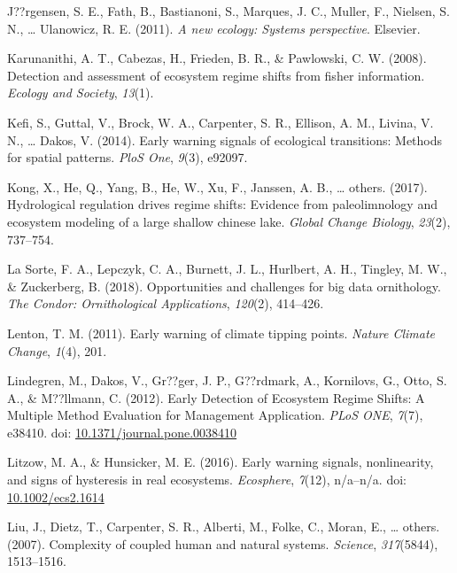 \documentclass[12pt,twoside,openany]{reedthesis}
\begin{document}
\leavevmode\hypertarget{ref-jorgensen_new_2011}{}%
J??rgensen, S. E., Fath, B., Bastianoni, S., Marques, J. C., Muller, F., Nielsen, S. N., \ldots{} Ulanowicz, R. E. (2011). \emph{A new ecology: Systems perspective}. Elsevier.

\leavevmode\hypertarget{ref-karunanithi_detection_2008}{}%
Karunanithi, A. T., Cabezas, H., Frieden, B. R., \& Pawlowski, C. W. (2008). Detection and assessment of ecosystem regime shifts from fisher information. \emph{Ecology and Society}, \emph{13}(1).

\leavevmode\hypertarget{ref-kefi2014early}{}%
Kefi, S., Guttal, V., Brock, W. A., Carpenter, S. R., Ellison, A. M., Livina, V. N., \ldots{} Dakos, V. (2014). Early warning signals of ecological transitions: Methods for spatial patterns. \emph{PloS One}, \emph{9}(3), e92097.

\leavevmode\hypertarget{ref-kong2017hydrological}{}%
Kong, X., He, Q., Yang, B., He, W., Xu, F., Janssen, A. B., \ldots{} others. (2017). Hydrological regulation drives regime shifts: Evidence from paleolimnology and ecosystem modeling of a large shallow chinese lake. \emph{Global Change Biology}, \emph{23}(2), 737--754.

\leavevmode\hypertarget{ref-lasorte2018opportunities}{}%
La Sorte, F. A., Lepczyk, C. A., Burnett, J. L., Hurlbert, A. H., Tingley, M. W., \& Zuckerberg, B. (2018). Opportunities and challenges for big data ornithology. \emph{The Condor: Ornithological Applications}, \emph{120}(2), 414--426.

\leavevmode\hypertarget{ref-lenton2011early}{}%
Lenton, T. M. (2011). Early warning of climate tipping points. \emph{Nature Climate Change}, \emph{1}(4), 201.

\leavevmode\hypertarget{ref-lindegren_early_2012}{}%
Lindegren, M., Dakos, V., Gr??ger, J. P., G??rdmark, A., Kornilovs, G., Otto, S. A., \& M??llmann, C. (2012). Early Detection of Ecosystem Regime Shifts: A Multiple Method Evaluation for Management Application. \emph{PLoS ONE}, \emph{7}(7), e38410. doi: \href{https://doi.org/10.1371/journal.pone.0038410}{10.1371/journal.pone.0038410}

\leavevmode\hypertarget{ref-litzow_early_2016}{}%
Litzow, M. A., \& Hunsicker, M. E. (2016). Early warning signals, nonlinearity, and signs of hysteresis in real ecosystems. \emph{Ecosphere}, \emph{7}(12), n/a--n/a. doi: \href{https://doi.org/10.1002/ecs2.1614}{10.1002/ecs2.1614}

\leavevmode\hypertarget{ref-liu_complexity_2007}{}%
Liu, J., Dietz, T., Carpenter, S. R., Alberti, M., Folke, C., Moran, E., \ldots{} others. (2007). Complexity of coupled human and natural systems. \emph{Science}, \emph{317}(5844), 1513--1516.
\end{document}

